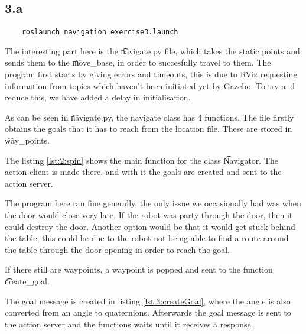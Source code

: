 
\subsection*{3.a}
\begin{lstlisting}
	roslaunch navigation exercise3.launch
\end{lstlisting}

The interesting part here is the \t{navigate.py} file, which takes the static points and sends them to the \t{move_base}, in order to succesfully travel to them. The program first starts by giving errors and timeouts, this is due to RViz requesting information from topics which haven't been initiated yet by Gazebo. To try and reduce this, we have added a delay in initialisation.

As can be seen in \t{navigate.py}, the navigate class has 4 functions. The file firstly obtains the goals that it has to reach from the location file. These are stored in \t{way_points}.




The listing \ref{lst:2:spin} shows the main function for the class \t{Navigator}. The action client is made there, and with it the goals are created and sent to the action server.

The program here ran fine generally, the only issue we occasionally had was when the door would close very late. If the robot was party through the door, then it could destroy the door. Another option would be that it would get stuck behind the table, this could be due to the robot not being able to find a route around the table through the door opening in order to reach the goal.

If there still are waypoints, a waypoint is popped and sent to the function \t{create_goal}.



The goal message is created in listing \ref{lst:3:createGoal}, where the angle is also converted from an angle to quaternions. Afterwards the goal message is sent to the action server and the functions waits until it receives a response. 



